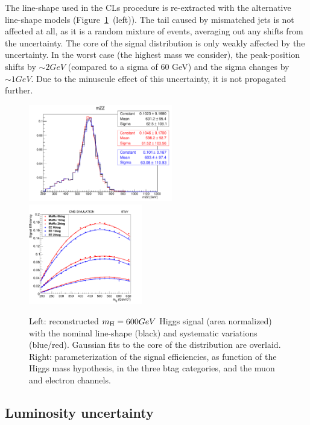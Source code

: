 The line-shape used in the CLs procedure is re-extracted with the alternative line-shape models (Figure~\ref{fig:lineshape}~(left)). The tail caused by mismatched jets is not affected at all, as it is a random mixture of events, averaging out any shifts from the uncertainty. The core of the signal distribution is only weakly affected by the uncertainty. In the worst case (the highest mass we consider), the peak-position shifts by $\sim2 GeV$ (compared to a sigma of 60 GeV{}) and the sigma changes by $\sim1 GeV$. Due to the minuscule effect of this uncertainty, it is not propagated further.

\begin{figure}[htb]
\begin{center}
\centerline{
\includegraphics[width=0.56\textwidth]{plots/lineshapeunc.pdf}
\includegraphics[width=0.44\textwidth]{plots/all_signal_effs.png}
}
\caption{Left: reconstructed $m_{\mathrm{H}} = 600 GeV$ Higgs signal (area normalized) with the nominal line-shape (black) and systematic variations (blue/red). Gaussian fits to the core of the distribution are overlaid. Right: parameterization of the signal efficiencies, as function of the Higgs mass hypothesis, in the three btag categories, and the muon and electron channels.
}
\label{fig:lineshape}
\end{center}
\end{figure}



\subsection{Luminosity uncertainty}

